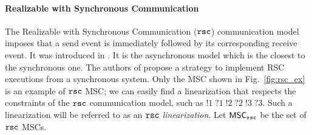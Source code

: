 \paragraph{\bf Realizable with Synchronous Communication}
The Realizable with Synchronous Communication ($\mathtt{rsc}$) communication model imposes that a send event is  immediately followed by its corresponding receive event. It was introduced in \cite{DBLP:journals/dc/Charron-BostMT96}. It is the asynchronous model which is the  closest to the synchronous one. %
The authors of \cite{kshemkalyani2011distributed} propose a strategy to implement RSC executions from a synchronous system.  
Only the MSC shown in Fig.~\ref{fig:rsc_ex} is an example of $\mathtt{rsc}$ MSC; we can easily find a linearization that respects the constraints of the $\mathtt{rsc}$ communication model, such as $!1\;?1\;!2\;?2\;!3\;?3$. Such a linearization will be referred to as an \emph{$\mathtt{rsc}$ linearization}. Let $\mathsf{MSC}_{\mathtt{rsc}}$ be the set of $\mathtt{rsc}$ MSCs.



